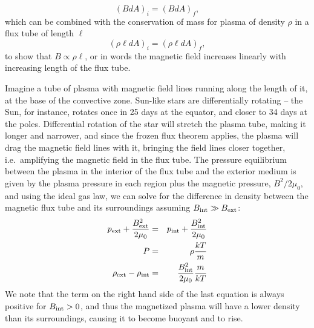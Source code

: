\begin{equation}
(B dA)_i = (B dA)_f,
\end{equation}
which can be combined with the conservation of mass for plasma of density $\rho$ in a flux tube of length $\ell$
\begin{equation}
(\rho \ell dA)_i = (\rho \ell dA)_f,
\end{equation}
to show that $B \propto \rho \ell$, or in words the magnetic field increases linearly with increasing length of the flux tube.

Imagine a tube of plasma with magnetic field lines running along the length of it, at the base of the convective zone. Sun-like stars are differentially rotating -- the Sun, for instance, rotates once in 25 days at the equator, and closer to 34 days at the poles. Differential rotation of the star will stretch the plasma tube, making it longer and narrower, and since the frozen flux theorem applies, the plasma will drag the magnetic field lines with it, bringing the field lines closer together, i.e.\ amplifying the magnetic field in the flux tube. The pressure equilibrium between the plasma in the interior of the flux tube and the exterior medium is given by the plasma pressure in each region plus the magnetic pressure, $B^2/2\mu_0$, and using the ideal gas law, we can solve for the difference in density between the magnetic flux tube and its surroundings assuming $B_{\rm int} \gg B_{\rm ext}$:
\begin{eqnarray}
p_{\rm ext} + \frac{B_{\rm ext}^2}{2\mu_0} &=& p_{\rm int} + \frac{B_{\rm int}^2}{2\mu_0}\\
P &=& \rho \frac{kT}{m} \\
\rho_{\rm ext} - \rho_{\rm int} &=& \frac{B_{\rm int}^2}{2\mu_0} \frac{m}{kT}
\end{eqnarray}
We note that the term on the right hand side of the last equation is always positive for $B_{\rm int} > 0$, and thus the magnetized plasma will have a lower density than its surroundings, causing it to become buoyant and to rise. 

